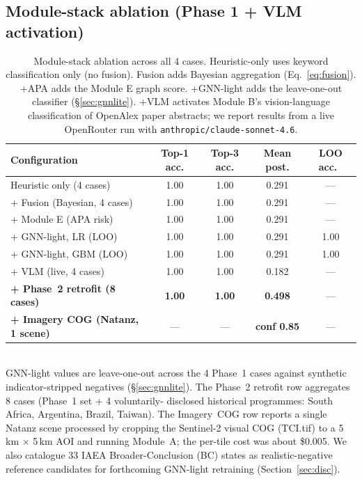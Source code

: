 \documentclass[11pt,a4paper]{article}
\begin{document}
\subsection{Module-stack ablation (Phase 1 + VLM activation)}\label{sec:ablation}

\begin{table}[h]
  \centering
  \small
  \caption{Module-stack ablation across all 4 cases. Heuristic-only
  uses keyword classification only (no fusion). Fusion adds Bayesian
  aggregation (Eq.~\ref{eq:fusion}). +APA adds the Module E graph
  score. +GNN-light adds the leave-one-out classifier
  (\S\ref{sec:gnnlite}). +VLM activates Module B's vision-language
  classification of OpenAlex paper abstracts; we report results from
  a live OpenRouter run with \texttt{anthropic/claude-sonnet-4.6}.}
  \label{tab:ablation}
  \begin{tabular}{lcccc}
  \toprule
  Configuration & Top-1 acc. & Top-3 acc. & Mean post. & LOO acc.\ \\
  \midrule
  Heuristic only (4 cases)         & 1.00 & 1.00 & 0.291 & --- \\
  + Fusion (Bayesian, 4 cases)     & 1.00 & 1.00 & 0.291 & --- \\
  + Module E (APA risk)            & 1.00 & 1.00 & 0.291 & --- \\
  + GNN-light, LR (LOO)            & 1.00 & 1.00 & 0.291 & 1.00 \\
  + GNN-light, GBM (LOO)           & 1.00 & 1.00 & 0.291 & 1.00 \\
  + VLM (live, 4 cases)            & 1.00 & 1.00 & 0.182 & --- \\
  \textbf{+ Phase~2 retrofit (8 cases)} & \textbf{1.00} & \textbf{1.00} & \textbf{0.498} & --- \\
  \textbf{+ Imagery COG (Natanz, 1 scene)} & --- & --- & \textbf{conf 0.85} & --- \\
  \bottomrule
  \end{tabular}
  \\[2pt]\footnotesize
  GNN-light values are leave-one-out across the 4 Phase~1 cases against
  synthetic indicator-stripped negatives (\S\ref{sec:gnnlite}). The
  Phase~2 retrofit row aggregates 8 cases (Phase~1 set + 4 voluntarily-
  disclosed historical programmes: South Africa, Argentina, Brazil,
  Taiwan). The Imagery~COG row reports a single Natanz scene processed
  by cropping the Sentinel-2 visual COG (TCI.tif) to a 5\,km $\times$
  5\,km AOI and running Module~A; the per-tile cost was about \$0.005.
  We also catalogue 33 IAEA Broader-Conclusion (BC) states as
  realistic-negative reference candidates for forthcoming GNN-light
  retraining (Section~\ref{sec:disc}).
\end{table}
\end{document}
